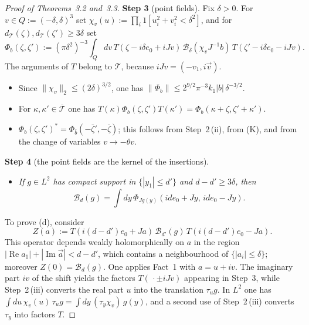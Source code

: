 \documentclass[11pt,letterpaper,reqno]{amsart}
\theoremstyle{definition}
\begin{document}
\begin{proof}[Proof of Theorems~3.2 and~3.3]
\textbf{Step 3} (point fields).
Fix $\delta>0$.
For $v\in Q:=(-\delta,\delta)^3$ set $\chi_v(u):=\prod_i1[u_i^2+v_i^2<\delta^2]$, and for $d_{\mathcal T}(\zeta),d_{\mathcal T}(\zeta')\ge3\delta$ set
\begin{equation*}
\Phi_b(\zeta,\zeta'):=(\pi\delta^2)^{-3}\int_Qdv\,T(\zeta-i\delta e_0+iJv)\,\mathcal B_\delta(\chi_vJ^{-1}b)\,T(\zeta'-i\delta e_0-iJv).
\end{equation*}
The arguments of $T$ belong to $\mathcal T$, because $iJv=(-v_1,i\vec v)$.
\begin{itemize}
\item[(a)] Since $\|\chi_v\|_2\le(2\delta)^{3/2}$, one has $\|\Phi_b\|\le2^{9/2}\pi^{-3}k_1|b|\,\delta^{-3/2}$.
\item[(b)] For $\kappa,\kappa'\in\overline{\mathcal T}$ one has $T(\kappa)\Phi_b(\zeta,\allowbreak \zeta')T(\kappa')=\allowbreak \Phi_b(\kappa+\zeta,\allowbreak \zeta'+\kappa')$.
\item[(c)] $\Phi_b(\zeta,\zeta')^*=\Phi_{\bar b}(-\bar\zeta',-\bar\zeta)$; this follows from Step~2\,(ii), from (K), and from the change of variables $v\to-\theta v$.
\end{itemize}

\textbf{Step 4} (the point fields are the kernel of the insertions).
\begin{itemize}
\item[(d)] \emph{If $g\in L^2$ has compact support in $\{|y_1|\le d'\}$ and $d-d'\ge3\delta$, then}
\begin{equation*}
\mathcal B_d(g)=\int dy\,\Phi_{Jg(y)}(ide_0+Jy,\,ide_0-Jy).
\end{equation*}
\end{itemize}
To prove (d), consider
\begin{equation*}
Z(a):=T(i(d-d')e_0+Ja)\,\mathcal B_{d'}(g)\,T(i(d-d')e_0-Ja).
\end{equation*}
This operator depends weakly holomorphically on $a$ in the region $|\operatorname{Re}a_1|+|\operatorname{Im}\vec a|<d-d'$, which contains a neighbourhood of $\{|a_i|\le\delta\}$; moreover $Z(0)=\mathcal B_d(g)$.
One applies Fact~1 with $a=u+iv$.
The imaginary part $iv$ of the shift yields the factors $T(\,\cdot\pm iJv)$ appearing in Step~3, while Step~2\,(iii) converts the real part $u$ into the translation $\tau_ug$.
In $L^2$ one has $\int du\,\chi_v(u)\,\tau_ug=\int dy\,(\tau_y\chi_v)\,g(y)$, and a second use of Step~2\,(iii) converts $\tau_y$ into factors $T$.


\end{proof}
\end{document}
